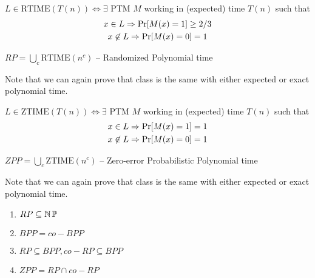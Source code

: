\begin{definition}[RTIME, RP]
	$L\in\text{RTIME}(T(n))\Leftrightarrow\exists$ PTM $M$ working in (expected) time $T(n)$ such that
    \begin{gather*}
    	x\in L\Rightarrow \operatorname{Pr}[M(x)=1]\geq 2/3\\
	x\not\in L\Rightarrow\operatorname{Pr}[M(x)=0]=1
    \end{gather*}

    $RP=\bigcup_c\text{RTIME}(n^c)$ -- Randomized Polynomial time

    Note that we can again prove that class is the same with either expected or exact polynomial time.
\end{definition}
\begin{definition}
    $L\in\text{ZTIME}(T(n))\Leftrightarrow\exists$ PTM $M$ working in (expected) time $T(n)$ such that
    \begin{gather*}
    	x\in L\Rightarrow \operatorname{Pr}[M(x)=1]=1\\
	x\not\in L\Rightarrow\operatorname{Pr}[M(x)=0]=1
    \end{gather*}

    $ZPP=\bigcup_c\text{ZTIME}(n^c)$ -- Zero-error Probabilistic Polynomial time

    Note that we can again prove that class is the same with either expected or exact polynomial time.
\end{definition}
\begin{lemma}\label{rp_bpp_zpp_prop}
    \begin{enumerate}
        \item $RP\subseteq \operatorname{\operatorname{\mathbb{N}}\mathbb{P}}$
        \item $BPP=co-BPP$
        \item $RP\subseteq BPP, co-RP\subseteq BPP$
        \item $ZPP=RP\cap co-RP$
    \end{enumerate}
\end{lemma}
